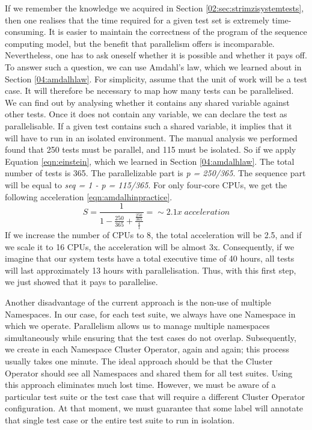 If we remember the knowledge we acquired in Section \ref{02:sec:strimzisystemtests}, then one realises that the time required for a given test set is extremely time-consuming. It is easier to maintain the correctness of the program of the sequence computing model, but the benefit that parallelism offers is incomparable. Nevertheless, one has to ask oneself whether it is possible and whether it pays off. To answer such a question, we can use Amdahl's law, which we learned about in Section \ref{04:amdalhlaw}. For simplicity, assume that the unit of work will be a test case. It will therefore be necessary to map how many tests can be parallelised. We can find out by analysing whether it contains any shared variable against other tests. Once it does not contain any variable, we can declare the test as parallelisable. If a given test contains such a shared variable, it implies that it will have to run in an isolated environment. The manual analysis we performed found that 250 tests must be parallel, and 115 must be isolated. So if we apply Equation \eqref{eqn:einstein}, which we learned in Section \ref{04:amdalhlaw}. The total number of tests is 365. The parallelizable part is \emph{p = 250/365}. The sequence part will be equal to \emph{seq = 1 - p = 115/365}. For only four-core CPUs, we get the following acceleration \eqref{eqn:amdalhinpractice}.
\begin{equation}
    \label{eqn:amdalhinpractice}
    S = \frac{1}{1 - \frac{250}{365} + \frac{\frac{250}{365}}{\frac{4}{1}}} =\sim 2.1x \; acceleration
    \tag{3}
\end{equation}
If we increase the number of CPUs to 8, the total acceleration will be 2.5, and if we scale it to 16 CPUs, the acceleration will be almost 3x. Consequently, if we imagine that our system tests have a total executive time of 40 hours, all tests will last approximately 13 hours with parallelisation. Thus, with this first step, we just showed that it pays to parallelise.

Another disadvantage of the current approach is the non-use of multiple Namespaces. In our case, for each test suite, we always have one Namespace in which we operate. Parallelism allows us to manage multiple namespaces simultaneously while ensuring that the test cases do not overlap. Subsequently, we create in each Namespace Cluster Operator, again and again; this process usually takes one minute. The ideal approach should be that the Cluster Operator should see all Namespaces and shared them for all test suites. Using this approach eliminates much lost time. However, we must be aware of a particular test suite or the test case that will require a different Cluster Operator configuration. At that moment, we must guarantee that some label will annotate that single test case or the entire test suite to run in isolation.

